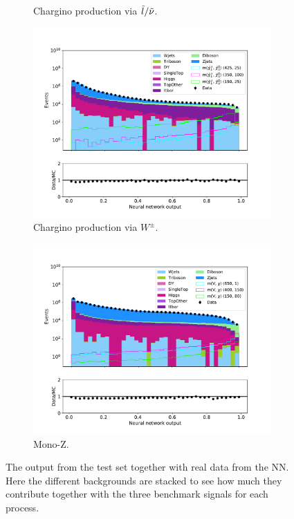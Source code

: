 \begin{figure}[H]
\begin{subfigure}[t!]{0.49\textwidth}
        \caption{Chargino production via $\Tilde{l}/\Tilde{\nu}$.}
        \label{fig:NNdataAllSlepSnu}
    \end{subfigure}      
    \begin{subfigure}[t!]{0.49\textwidth}
        \includegraphics[width = \textwidth]{Figures/Stacked/stackedplot_NN_All_level_WW.pdf}
        \caption{Chargino production via $W^\pm$.}
        \label{fig:NNdataAllWW}
    \end{subfigure}
    \begin{subfigure}[t!]{0.49\textwidth}
        \includegraphics[width = \textwidth]{Figures/Stacked/stackedplot_NN_All_level_monoZ.pdf}
        \caption{Mono-Z.}
        \label{fig:NNdataAllmonoZ}
    \end{subfigure}
    \caption{The output from the test set together with real data from the NN. Here the different backgrounds are stacked to see how much they contribute together with the three benchmark signals for each process.}
    \label{fig:NNdataAll}
\end{figure}

